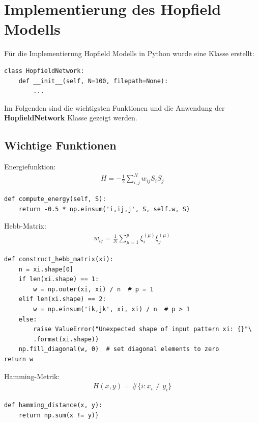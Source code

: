 \section{Implementierung des Hopfield Modells}
Für die Implementierung Hopfield Modells in Python wurde eine Klasse erstellt:
\begin{verbatim}
class HopfieldNetwork:
	def __init__(self, N=100, filepath=None):
		...
\end{verbatim}
Im Folgenden sind die wichtigsten Funktionen und die Anwendung der \textbf{HopfieldNetwork} Klasse gezeigt werden.
\subsection{Wichtige Funktionen} 
Energiefunktion:
\begin{align}
H = - \frac{1}{2} \sum_{i,j}^{N} w_{ij} S_i S_j
\end{align}
\begin{verbatim}
def compute_energy(self, S):
    return -0.5 * np.einsum('i,ij,j', S, self.w, S)
\end{verbatim}
Hebb-Matrix:
\begin{align}
w_{ij} = \frac{1}{N} \sum_{\mu = 1}^{p} \xi_i^{(\mu)} \xi_j^{(\mu)}
\end{align}
\begin{verbatim}
def construct_hebb_matrix(xi):
	n = xi.shape[0]
	if len(xi.shape) == 1:
		w = np.outer(xi, xi) / n  # p = 1
	elif len(xi.shape) == 2:
		w = np.einsum('ik,jk', xi, xi) / n  # p > 1
	else:
		raise ValueError("Unexpected shape of input pattern xi: {}"\
		.format(xi.shape))
	np.fill_diagonal(w, 0)  # set diagonal elements to zero
return w
\end{verbatim}
Hamming-Metrik:
\begin{align}
H(x,y) = \# \{i: x_i \neq y_i\}
\end{align}
\begin{verbatim}
def hamming_distance(x, y):
    return np.sum(x != y)}
\end{verbatim}

